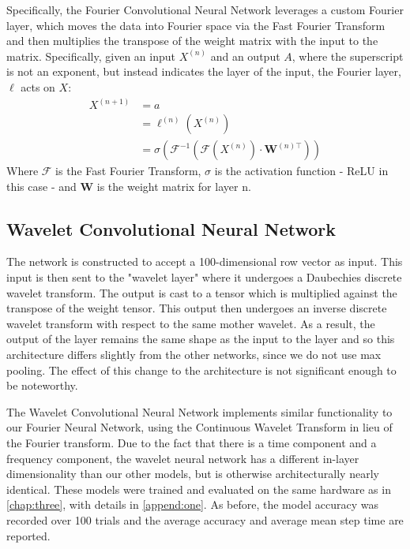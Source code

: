 Specifically, the Fourier Convolutional Neural Network leverages a custom Fourier layer, which moves the data into Fourier space via the Fast Fourier Transform and then multiplies the transpose of the weight matrix with the input to the matrix.
Specifically, given an input $X^{(n)}$ and an output $A$, where the superscript is not an exponent, but instead indicates the layer of the input, the Fourier layer, $\ell$ acts on $X$:
\begin{align*}
X^{(n+1)} & = a \\
& = \ell^{(n)}(X^{(n)}) \\
& = \sigma(\mathcal{F}^{-1}(\mathcal{F}(X^{(n)})\cdot \mathbf{W}^{(n)\top}))
\end{align*}
Where $\mathcal{F}$ is the Fast Fourier Transform, $\sigma$ is the activation function - ReLU in this case - and $\mathbf{W}$ is the weight matrix for layer n.

\subsection{Wavelet Convolutional Neural Network} \label{wavelet cnn}
The network is constructed to accept a 100-dimensional row vector as input.
This input is then sent to the "wavelet layer" where it undergoes a Daubechies discrete wavelet transform.
The output is cast to a tensor which is multiplied against the transpose of the weight tensor.
This output then undergoes an inverse discrete wavelet transform with respect to the same mother wavelet.
As a result, the output of the layer remains the same shape as the input to the layer and so this architecture differs slightly from the other networks, since we do not use max pooling. 
The effect of this change to the architecture is not significant enough to be noteworthy.

The Wavelet Convolutional Neural Network implements similar functionality to our Fourier Neural Network, using the Continuous Wavelet Transform in lieu of the Fourier transform.
Due to the fact that there is a time component and a frequency component, the wavelet neural network has a different in-layer dimensionality than our other models, but is otherwise architecturally nearly identical.
These models were trained and evaluated on the same hardware as in \ref{chap:three}, with details in \ref{append:one}.
As before, the model accuracy was recorded over 100 trials and the average accuracy and average mean step time are reported.

